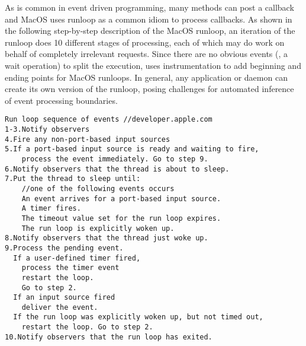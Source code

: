 As is common in event driven programming, many methods can post a callback and
MacOS uses runloop as a common idiom to process callbacks.  As shown in the
following step-by-step description of the MacOS runloop, an iteration of the
runloop does 10 different stages of processing, each of which may do work on
behalf of completely irrelevant requests.  Since there are no obvious events
(\eg, a wait operation) to split the execution, \xxx uses instrumentation to
add beginning and ending points for MacOS runloops.  In general, any
application or daemon can create its own version of the runloop, posing
challenges for automated inference of event processing boundaries.

{\footnotesize \begin{verbatim}
Run loop sequence of events //developer.apple.com
1-3.Notify observers
4.Fire any non-port-based input sources
5.If a port-based input source is ready and waiting to fire,
    process the event immediately. Go to step 9.
6.Notify observers that the thread is about to sleep.
7.Put the thread to sleep until:
    //one of the following events occurs
    An event arrives for a port-based input source.
    A timer fires.
    The timeout value set for the run loop expires.
    The run loop is explicitly woken up.
8.Notify observers that the thread just woke up.
9.Process the pending event.
  If a user-defined timer fired,
    process the timer event
    restart the loop.
    Go to step 2.
  If an input source fired
    deliver the event.
  If the run loop was explicitly woken up, but not timed out,
    restart the loop. Go to step 2.
10.Notify observers that the run loop has exited.

\end{verbatim}
}





